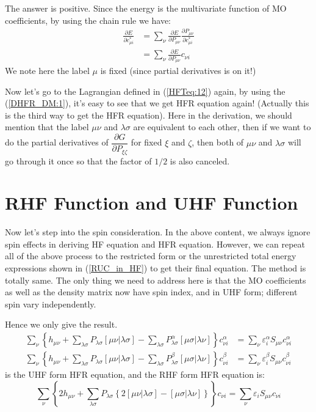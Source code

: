 The answer is positive. Since the energy is the multivariate function of MO
coefficients, by using the chain rule we have:
\begin{align}\label{DHFR_DM:1}
\frac{\partial E}{\partial c^{*}_{\mu i}}  &=  \sum_{\nu}\frac{\partial
E}{\partial P_{\mu \nu}}\frac{\partial P_{\mu \nu}}{\partial c^{*}_{\mu i}}
\nonumber \\
&=  \sum_{\nu}\frac{\partial
E}{\partial P_{\mu \nu}} c_{\nu i}
\end{align}
We note here the label $\mu$ is fixed (since partial derivatives is on it!)

Now let's go to the Lagrangian defined in (\ref{HFTeq:12}) again, by using the
(\ref{DHFR_DM:1}), it's easy to see that we get HFR equation again! (Actually
this is the third way to get the HFR equation). Here in the derivation, we
should mention that the label $\mu\nu$ and $\lambda\sigma$ are equivalent to
each other, then if we want to do the partial derivatives of $\dfrac{\partial
G}{\partial P_{\xi\zeta}}$ for fixed $\xi$ and $\zeta$, then both of $\mu\nu$
and $\lambda\sigma$ will go through it once so that the factor of $1/2$ is also
canceled.




\section{RHF Function and UHF Function}
\label{RHFUHF_in_HF}
%
%
Now let's step into the spin consideration. In the above content, we always
ignore spin effects in deriving HF equation and HFR equation. However, we can
repeat all of the above process to the restricted form or the unrestricted
total energy expressions shown in (\ref{RUC_in_HF}) to get their final equation.
The method is totally same. The only thing we need to address here is that the
MO coefficients as well as the density matrix now have spin index, and in UHF
form; different spin vary independently.

Hence we only give the result.
\begin{align}\label{HFTeq:49}
\sum_{\nu}  \left \{
    h_{\mu \nu} +
    \sum_{\lambda\sigma}P_{\lambda\sigma}
    [\mu\nu | \lambda\sigma] -
    \sum_{\lambda\sigma}P^{\alpha}_{\lambda\sigma}
    [\mu\sigma|\lambda\nu]
    \right \}c_{\nu i}^{\alpha} &= \sum_{\nu}
    \varepsilon_{i}^{\alpha}S_{\mu\nu}c_{\nu i}^{\alpha}
    \nonumber \\
\sum_{\nu}  \left \{
    h_{\mu \nu} +
    \sum_{\lambda\sigma}P_{\lambda\sigma}
    [\mu\nu | \lambda\sigma] -
    \sum_{\lambda\sigma}P^{\beta}_{\lambda\sigma}
    [\mu\sigma|\lambda\nu]
    \right \}c_{\nu i}^{\beta} &= \sum_{\nu}
    \varepsilon_{i}^{\beta}S_{\mu\nu}c_{\nu i}^{\beta}
\end{align}
is the UHF form HFR equation, and the RHF form HFR equation is:
\begin{equation}
\sum_{\nu}  \left \{
    2h_{\mu \nu} +
    \sum_{\lambda\sigma}P_{\lambda\sigma}
    \left \{ 2[\mu\nu | \lambda\sigma] - [\mu\sigma|\lambda\nu]
    \right \} \right \}c_{\nu i} = \sum_{\nu}
    \varepsilon_{i}S_{\mu\nu}c_{\nu i}
\end{equation}



